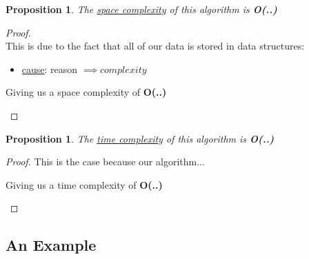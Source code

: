 \documentclass[12pt]{article}
\newtheorem{proposition}[theorem]{Proposition}
\begin{document}
\begin{proposition}
\label{numq}
The \underline{space complexity} of this algorithm is \textbf{O(..)}
\end{proposition}

\begin{proof}
~ \\ \indent This is due to the fact that all of our data is stored in data structures:
\begin{itemize}
    \item \underline{cause}: reason $\implies complexity$
\end{itemize}
\begin{center}
    Giving us a space complexity of \textbf{O(..)}
\end{center}
\end{proof}

\begin{proposition}
\label{numq}
The \underline{time complexity} of this algorithm is \textbf{O(..)}
\end{proposition}

\begin{proof}
This is the case because our algorithm...
\begin{center}
    Giving us a time complexity of \textbf{O(..)}
\end{center}
\end{proof}


\subsection{An Example}



\end{document}
